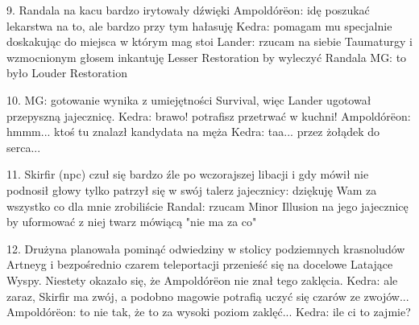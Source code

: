 \documentclass[10pt,twoside,twocolumn]{book}
\begin{document}
9. Randala na kacu bardzo irytowały dźwięki
Ampoldórëon: idę poszukać lekarstwa na to, ale bardzo przy tym hałasuję
Kedra: pomagam mu specjalnie doskakując do miejsca w którym mag stoi
Lander: rzucam na siebie Taumaturgy i wzmocnionym głosem inkantuję Lesser Restoration by wyleczyć Randala
MG: to było Louder Restoration

10. MG: gotowanie wynika z umiejętności Survival, więc Lander ugotował przepyszną jajecznicę.
Kedra: brawo! potrafisz przetrwać w kuchni!
Ampoldórëon: hmmm... ktoś tu znalazł kandydata na męża
Kedra: taa... przez żołądek do serca...

11. Skirfir (npc) czuł się bardzo źle po wczorajszej libacji i gdy mówił nie podnosił głowy tylko patrzył się w swój talerz jajecznicy: dziękuję Wam za wszystko co dla mnie zrobiliście
Randal: rzucam Minor Illusion na jego jajecznicę by uformować z niej twarz mówiącą "nie ma za co"

12. Drużyna planowała pominąć odwiedziny w stolicy podziemnych krasnoludów Artneyg i bezpośrednio czarem teleportacji przenieść się na docelowe Latające Wyspy. Niestety okazało się, że Ampoldórëon nie znał tego zaklęcia.
Kedra: ale zaraz, Skirfir ma zwój, a podobno magowie potrafią uczyć się czarów ze zwojów...
Ampoldórëon: to nie tak, że to za wysoki poziom zaklęć...
Kedra: ile ci to zajmie?



%    
%       
\end{document}
